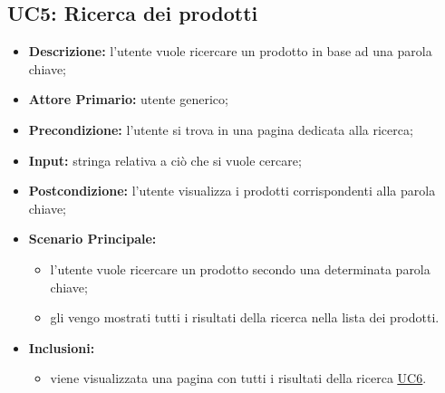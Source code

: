         \subsection{UC5: Ricerca dei prodotti}
        \label{sec:UC5}
        \begin{itemize}
            \item \textbf{Descrizione:} l'utente vuole ricercare un prodotto in base ad una parola chiave; 
            \item \textbf{Attore Primario:} utente generico;
            \item \textbf{Precondizione:} l'utente si trova in una pagina dedicata alla ricerca; 
            \item \textbf{Input:} stringa relativa a ciò che si vuole cercare;
            \item \textbf{Postcondizione:} l'utente visualizza i prodotti corrispondenti alla parola chiave;
            \item \textbf{Scenario Principale:}
            \begin{itemize}
                \item l'utente vuole ricercare un prodotto secondo una determinata parola chiave;
                \item gli vengo mostrati tutti i risultati della ricerca nella lista dei prodotti.
            \end{itemize}
            \item \textbf{Inclusioni:}
            \begin{itemize}
                \item viene visualizzata una pagina con tutti i risultati della ricerca \hyperref[sec:UC6]{\underline{UC6}}.
            \end{itemize}
        \end{itemize}
